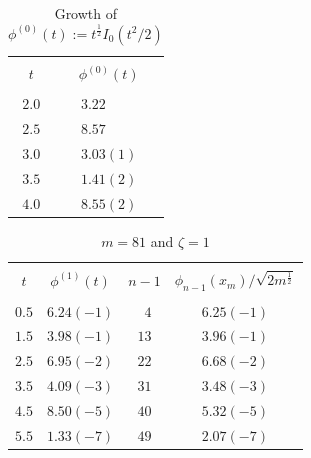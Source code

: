 \begin{table}
\caption{Growth of $\phi^{(0)}(t):=t^\frac{1}{2} I_{0}(t^{2}/2)$}
\begin{center}
\begin{tabular}{|cc|}
\hline
 & \\
$t$ & $\phi^{(0)}(t)$\\
 & \\
\hline
$2.0$ & $3.22\phantom{(2)}$ \\
$2.5$ & $8.57\phantom{(2)}$ \\
$3.0$ & $3.03 (1)$ \\
$3.5$ & $1.41 (2)$ \\
$4.0$ & $8.55 (2)$ \\
\hline
\end{tabular}
\end{center}
\end{table}

\begin{table}
\caption{$m = 81$ and $\zeta=1$}
\begin{center}
\begin{tabular}{|cccc|}
\hline
& & & \\
$t$ & $\phi^{(1)}(t)$ & $n-1$ & $\phi_{n-1}(x_{m})/\sqrt{2m^{\frac{1}{2}}}$\\
& & & \\
\hline
$0.5$ & $6.24 (-1)$ & $\phantom{1}4$ & $6.25 (-1)$ \\
$1.5$ & $3.98 (-1)$ & $13$ & $3.96 (-1)$ \\
$2.5$ & $6.95 (-2)$ & $22$ & $6.68 (-2)$ \\
$3.5$ & $4.09 (-3)$ & $31$ & $3.48 (-3)$ \\
$4.5$ & $8.50 (-5)$ & $40$ & $5.32 (-5)$ \\
$5.5$ & $1.33 (-7)$ & $49$ & $2.07 (-7)$ \\
\hline
\end{tabular}
\end{center}
\end{table}









